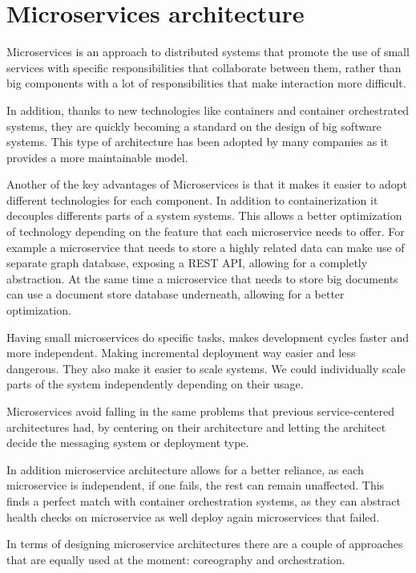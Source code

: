 \section{Microservices architecture}


Microservices is an approach to distributed systems that promote the use of small services with specific responsibilities that collaborate between them, rather than big components with a lot of responsibilities that make interaction more difficult.
 
In addition, thanks to new technologies like containers and container orchestrated systems, they are quickly becoming a standard on the design of big software systems. This type of architecture has been adopted by many companies as it provides a more maintainable model. 
 
Another of the key advantages of Microservices is that it makes it easier to adopt different technologies for each component. In addition to containerization it decouples differents parts of a system systems. This allows a better optimization of technology depending on the feature that each microservice needs to offer. For example a microservice that needs to store a highly related data can make use of separate graph database, exposing a REST API, allowing for a completly abstraction. At the same time a microservice that needs to store big documents can use a document store database underneath, allowing for a better optimization. 
 
 
 
Having small microservices do specific tasks, makes development cycles faster and more independent. Making incremental deployment way easier and less dangerous. They also make it easier to scale systems. We could individually scale parts of the system independently depending on their usage.
 
Microservices avoid falling in the same problems that previous service-centered architectures had, by centering on their architecture and letting the architect decide the messaging system or deployment type.
 
In addition microservice architecture allows for a better reliance, as each microservice is independent, if one fails, the rest can remain unaffected. This finds a perfect match with container orchestration systems, as they can abstract health checks on microservice as well deploy again microservices that failed.
 
In terms of designing microservice architectures there are a couple of approaches that are equally used at the moment: coreography and orchestration\parencite{microservices}.

